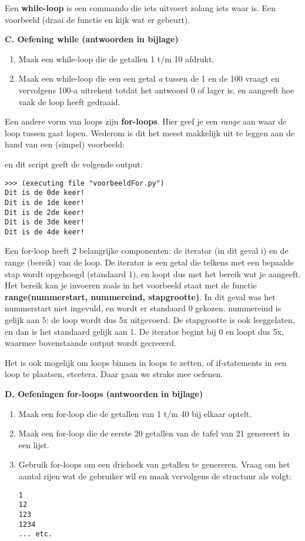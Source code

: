 Een \textbf{while-loop} is een commando die iets uitvoert zolang iets waar is. Een voorbeeld (draai de functie en kijk wat er gebeurt).



\textbf{C. Oefening while (antwoorden in bijlage)}
\begin{enumerate}[label=\textbf{C.\arabic*}]
\item Maak een while-loop die de getallen 1 t/m 10 afdrukt.
\item Maak een while-loop die een een getal \textit{a} tussen de 1 en de 100 vraagt en vervolgens 100-a uitrekent totdat het antwoord 0 of lager is, en aangeeft hoe vaak de loop heeft gedraaid.  
\end{enumerate}

Een andere vorm van loops zijn \textbf{for-loops}. Hier geef je een \textit{range} aan waar de loop tussen gaat lopen. Wederom is dit het meest makkelijk uit te leggen aan de hand van een (simpel) voorbeeld:


en dit script geeft de volgende output:
\begin{lstlisting}[frame=single]
>>> (executing file "voorbeeldFor.py")
Dit is de 0de keer!
Dit is de 1de keer!
Dit is de 2de keer!
Dit is de 3de keer!
Dit is de 4de keer!
\end{lstlisting}

Een for-loop heeft 2 belangrijke componenten: de iterator (in dit geval i) en de range (bereik) van de loop. De iterator is een getal die telkens met een bepaalde stap wordt opgehoogd (standaard 1), en loopt dus met het bereik wat je aangeeft. Het bereik kan je invoeren zoals in het voorbeeld staat met de functie \textbf{range(nummerstart, nummereind, stapgrootte)}. In dit geval was het nummerstart niet ingevuld, en wordt er standaard 0 gekozen. nummereind is gelijk aan 5: de loop wordt dus 5x uitgevoerd. De stapgrootte is ook leeggelaten, en dan is het standaard gelijk aan 1. De iterator begint bij 0 en loopt dus 5x, waarmee bovenstaande output wordt gecreeerd. 

Het is ook mogelijk om loops binnen in loops te zetten, of if-statements in een loop te plaatsen, etcetera. Daar gaan we straks mee oefenen.


\textbf{D. Oefeningen for-loops (antwoorden in bijlage)}
\begin{enumerate}[label=\textbf{D.\arabic*}]
\item Maak een for-loop die de getallen van 1 t/m 40 bij elkaar optelt.
\item Maak een for-loop die de eerste 20 getallen van de tafel van 21 genereert in een lijst.
\item Gebruik for-loops om een driehoek van getallen te genereren. Vraag om het aantal rijen wat de gebruiker wil en maak vervolgens de structuur als volgt:\begin{lstlisting}1 
12 
123 
1234 
... etc. \end{lstlisting}
\end{enumerate}

